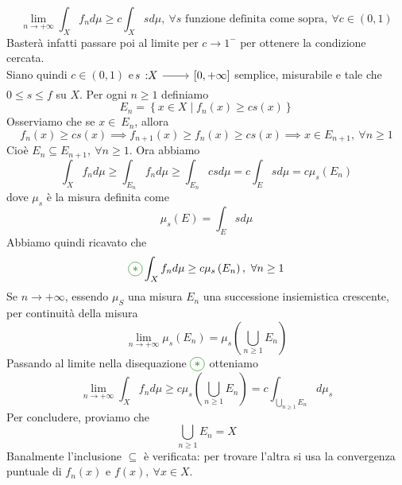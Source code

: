 \begin{demonstration}
\begin{enumerate}[label=\Roman*]
\begin{equation*}
	\lim_{n\to+\infty}\int_Xf_nd\mu\geq c\int_Xsd\mu,\ \forall s\text{ funzione definita come sopra},\ \forall c\in\left(0,1\right)
\end{equation*}
Basterà infatti passare poi al limite per $c\to 1^{-}$ per ottenere la condizione cercata.\\
Siano quindi $c\in\left(0,1\right)$ e $\funz{s}{X}{\left[0,+\infty\right]}$ semplice, misurabile e tale che $0\leq s\leq f$ su $X$. Per ogni $n\geq 1$ definiamo
\begin{equation*}
	E_n=\left\{x\in X\mid f_n\left(x\right)\geq cs\left(x\right)\right\}
\end{equation*}
Osserviamo che se $x\in\ E_n$, allora
\begin{equation*}
	f_n\left(x\right)\geq cs\left(x\right)\implies f_{n+1}\left(x\right)\geq f_n\left(x\right)\geq cs\left(x\right)\implies x\in E_{n+1},\ \forall n\geq 1
\end{equation*}
Cioè $E_n\subseteq E_{n+1},\ \forall n\geq 1$.
Ora abbiamo
\begin{equation*}
	\int_Xf_nd\mu\geq \int_{E_n}f_nd\mu\geq \int_{E_n}csd\mu=c\int_Esd\mu=c\mu_s\left(E_n\right)
\end{equation*}
dove $\mu_s$ è la misura definita come 
\begin{equation*}
	\mu_s\left(E\right)=\int_Esd\mu
\end{equation*}
Abbiamo quindi ricavato che
\begin{equation*}
	\textcolor{green}{\circled{\ast}}\int_Xf_nd\mu\geq c\mu_s\left(E_n\right),\ \forall n\geq 1
\end{equation*}
Se $n\to+\infty$, essendo $\mu_S$ una misura $E_n$ una successione insiemistica crescente, per continuità della misura
\begin{equation*}
	\lim_{n\to+\infty}\mu_s\left(E_n\right)=\mu_s\left(\bigcup_{n\geq 1}E_n\right)
\end{equation*}
Passando al limite nella disequazione $\textcolor{green}{\circled{\ast}}$ otteniamo
\begin{equation*}
	\lim_{n\to+\infty}\int_Xf_nd\mu\geq c\mu_s\left(\bigcup_{n\geq 1}E_n\right)=c\int_{\bigcup_{n\geq 1}E_n}d\mu_s
\end{equation*}
Per concludere, proviamo che
\begin{equation*}
	\bigcup_{n\geq 1}E_n=X
\end{equation*}
Banalmente l'inclusione $\subseteq$ è verificata: per trovare l'altra si usa la convergenza puntuale di $f_n\left(x\right)$ e $f\left(x\right),\ \forall x\in X$.\qedhere
	\end{enumerate}
\end{demonstration}

